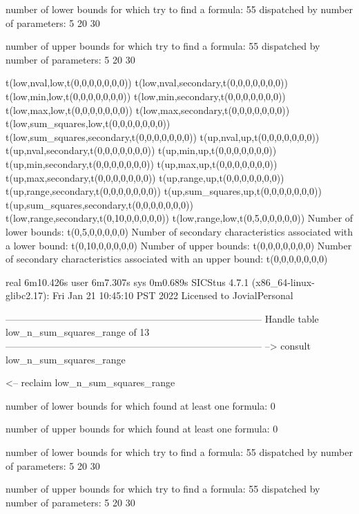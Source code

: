 number of lower bounds for which try to find a formula: 55
dispatched by number of parameters: 5  20  30

number of upper bounds for which try to find a formula: 55
dispatched by number of parameters: 5  20  30

t(low,nval,low,t(0,0,0,0,0,0,0))
t(low,nval,secondary,t(0,0,0,0,0,0,0))
t(low,min,low,t(0,0,0,0,0,0,0))
t(low,min,secondary,t(0,0,0,0,0,0,0))
t(low,max,low,t(0,0,0,0,0,0,0))
t(low,max,secondary,t(0,0,0,0,0,0,0))
t(low,sum_squares,low,t(0,0,0,0,0,0,0))
t(low,sum_squares,secondary,t(0,0,0,0,0,0,0))
t(up,nval,up,t(0,0,0,0,0,0,0))
t(up,nval,secondary,t(0,0,0,0,0,0,0))
t(up,min,up,t(0,0,0,0,0,0,0))
t(up,min,secondary,t(0,0,0,0,0,0,0))
t(up,max,up,t(0,0,0,0,0,0,0))
t(up,max,secondary,t(0,0,0,0,0,0,0))
t(up,range,up,t(0,0,0,0,0,0,0))
t(up,range,secondary,t(0,0,0,0,0,0,0))
t(up,sum_squares,up,t(0,0,0,0,0,0,0))
t(up,sum_squares,secondary,t(0,0,0,0,0,0,0))
t(low,range,secondary,t(0,10,0,0,0,0,0))
t(low,range,low,t(0,5,0,0,0,0,0))
Number of lower bounds:                                             t(0,5,0,0,0,0,0)
Number of secondary characteristics associated with a lower bound:  t(0,10,0,0,0,0,0)
Number of upper bounds:                                             t(0,0,0,0,0,0,0)
Number of secondary characteristics associated with an upper bound: t(0,0,0,0,0,0,0)

real	6m10.426s
user	6m7.307s
sys	0m0.689s
SICStus 4.7.1 (x86_64-linux-glibc2.17): Fri Jan 21 10:45:10 PST 2022
Licensed to JovialPersonal


--------------------------------------------------------------------------------
Handle table low_n_sum_squares_range of 13
--------------------------------------------------------------------------------
--> consult low_n_sum_squares_range

<-- reclaim low_n_sum_squares_range

number of lower bounds for which found at least one formula: 0

number of upper bounds for which found at least one formula: 0

number of lower bounds for which try to find a formula: 55
dispatched by number of parameters: 5  20  30

number of upper bounds for which try to find a formula: 55
dispatched by number of parameters: 5  20  30

